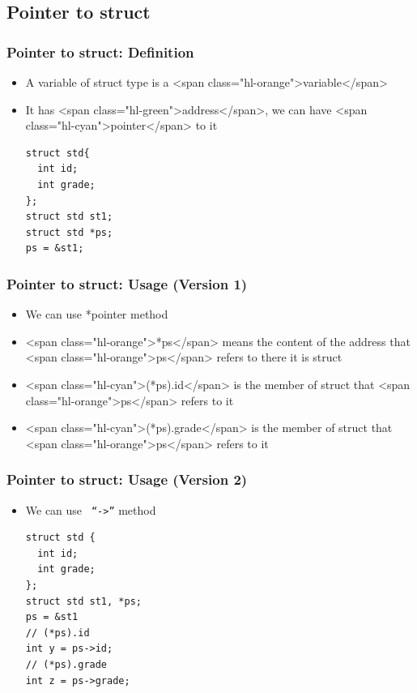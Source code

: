 \documentclass{../c-lecture}
\begin{document}
\subsection{Pointer to struct}

\begin{frame}[fragile]
  \frametitle{Pointer to struct: Definition}
  \begin{itemize}
    \item
      A variable of struct type is a <span class="hl-orange">variable</span>

    \item
      It has <span class="hl-green">address</span>, we can have
      <span class="hl-cyan">pointer</span> to it

    \begin{verbatim}
struct std{
  int id;
  int grade;
};
struct std st1;
struct std *ps;
ps = &st1;
    \end{verbatim}
  \end{itemize}
\end{frame}

\begin{frame}
  \frametitle{Pointer to struct: Usage (Version 1)}
  \begin{itemize}
    \item We can use *pointer method
    \item
      <span class="hl-orange">*ps</span> means the content of the address that
      <span class="hl-orange">ps</span> refers to there \textrightarrow it is struct

    \item
      <span class="hl-cyan">(*ps).id</span> is the member of struct that
      <span class="hl-orange">ps</span> refers to it

    \item
      <span class="hl-cyan">(*ps).grade</span> is the member of struct that
      <span class="hl-orange">ps</span> refers to it

  \end{itemize}
\end{frame}

\begin{frame}[fragile]
  \frametitle{Pointer to struct: Usage (Version 2)}
  \begin{itemize}
    \item We can use \texttt{\color{Orange} ``->''} method
    \begin{verbatim}
struct std {
  int id;
  int grade;
};
struct std st1, *ps;
ps = &st1
// (*ps).id
int y = ps->id;
// (*ps).grade
int z = ps->grade;
    \end{verbatim}
  \end{itemize}
\end{frame}
\end{document}
